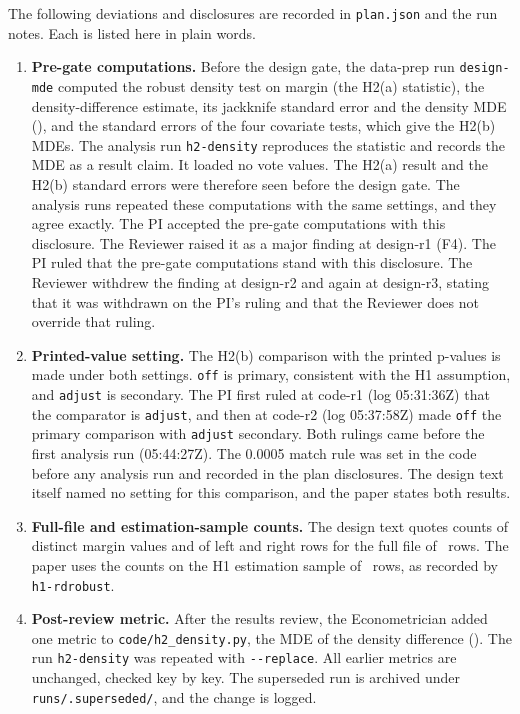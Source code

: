 \documentclass[11pt]{article}
\begin{document}
The following deviations and disclosures are recorded in \texttt{plan.json} and the run notes. Each is listed here in plain words.
\begin{enumerate}
\item \textbf{Pre-gate computations.} Before the design gate, the data-prep run \texttt{design-mde} computed the robust density test on margin (the H2(a) statistic), the density-difference estimate, its jackknife standard error and the density MDE (\RdDensityMde), and the standard errors of the four covariate tests, which give the H2(b) MDEs. The analysis run \texttt{h2-density} reproduces the statistic and records the MDE as a result claim. It loaded no vote values. The H2(a) result and the H2(b) standard errors were therefore seen before the design gate. The analysis runs repeated these computations with the same settings, and they agree exactly. The PI accepted the pre-gate computations with this disclosure. The Reviewer raised it as a major finding at design-r1 (F4). The PI ruled that the pre-gate computations stand with this disclosure. The Reviewer withdrew the finding at design-r2 and again at design-r3, stating that it was withdrawn on the PI's ruling and that the Reviewer does not override that ruling.
\item \textbf{Printed-value setting.} The H2(b) comparison with the printed p-values is made under both settings. \texttt{off} is primary, consistent with the H1 assumption, and \texttt{adjust} is secondary. The PI first ruled at code-r1 (log 05:31:36Z) that the comparator is \texttt{adjust}, and then at code-r2 (log 05:37:58Z) made \texttt{off} the primary comparison with \texttt{adjust} secondary. Both rulings came before the first analysis run (05:44:27Z). The 0.0005 match rule was set in the code before any analysis run and recorded in the plan disclosures. The design text itself named no setting for this comparison, and the paper states both results.
\item \textbf{Full-file and estimation-sample counts.} The design text quotes counts of distinct margin values and of left and right rows for the full file of \RdDensityN\ rows. The paper uses the counts on the H1 estimation sample of \RdN\ rows, as recorded by \texttt{h1-rdrobust}.
\item \textbf{Post-review metric.} After the results review, the Econometrician added one metric to \texttt{code/h2\_density.py}, the MDE of the density difference (\RdDensityMde). The run \texttt{h2-density} was repeated with \texttt{-{}-replace}. All earlier metrics are unchanged, checked key by key. The superseded run is archived under \texttt{runs/.superseded/}, and the change is logged.

\end{enumerate}
\end{document}
